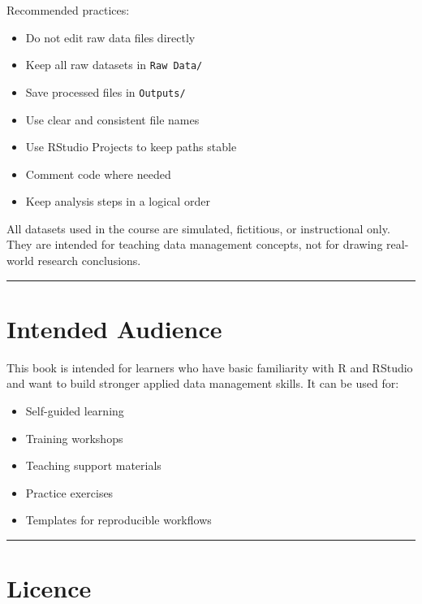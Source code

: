\documentclass[
  11pt,
  oneside]{book}
\providecommand{\tightlist}{%
  \setlength{\itemsep}{0pt}\setlength{\parskip}{0pt}}
\begin{document}
Recommended practices:

\begin{itemize}
\tightlist
\item
  Do not edit raw data files directly
\item
  Keep all raw datasets in \texttt{Raw\ Data/}
\item
  Save processed files in \texttt{Outputs/}
\item
  Use clear and consistent file names
\item
  Use RStudio Projects to keep paths stable
\item
  Comment code where needed
\item
  Keep analysis steps in a logical order
\end{itemize}

All datasets used in the course are simulated, fictitious, or instructional only. They are intended for teaching data management concepts, not for drawing real-world research conclusions.

\begin{center}\rule{0.5\linewidth}{0.5pt}\end{center}

\chapter*{Intended Audience}\label{intended-audience}

This book is intended for learners who have basic familiarity with R and RStudio and want to build stronger applied data management skills. It can be used for:

\begin{itemize}
\tightlist
\item
  Self-guided learning
\item
  Training workshops
\item
  Teaching support materials
\item
  Practice exercises
\item
  Templates for reproducible workflows
\end{itemize}

\begin{center}\rule{0.5\linewidth}{0.5pt}\end{center}

\chapter*{Licence}\label{licence}
\end{document}
